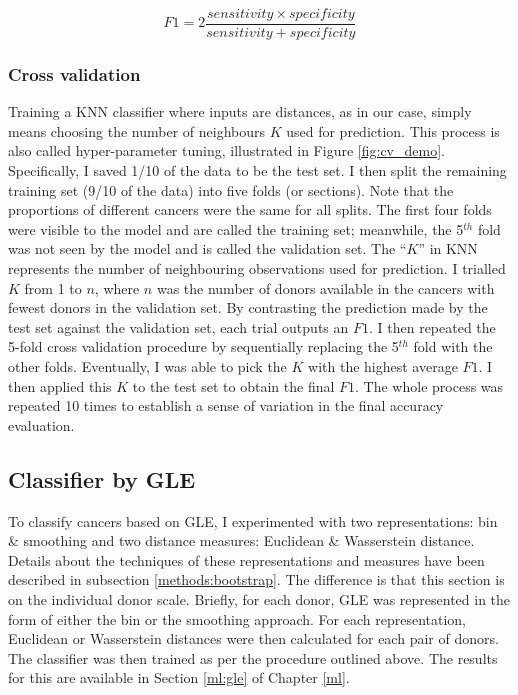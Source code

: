 \begin{equation}
    F1 = 2\frac{sensitivity \times specificity}{sensitivity + specificity}    
    \label{eq:f1}
\end{equation}

\subsubsection{Cross validation}
Training a KNN classifier where inputs are distances, as in our case, simply means choosing the number of neighbours $K$ used for prediction. This process is also called hyper-parameter tuning, illustrated in Figure \ref{fig:cv_demo}. Specifically, I saved 1/10 of the data to be the test set. I then split the remaining training set (9/10 of the data) into five folds (or sections). Note that the proportions of different cancers were the same for all splits. The first four folds were visible to the model and are called the training set; meanwhile, the 5$^{th}$ fold was not seen by the model and is called the validation set. The ``$K$'' in KNN represents the number of neighbouring observations used for prediction. I trialled $K$ from 1 to $n$, where $n$ was the number of donors available in the cancers with fewest donors in the validation set. By contrasting the prediction made by the test set against the validation set, each trial outputs an $F1$. I then repeated the 5-fold cross validation procedure by sequentially replacing the 5$^{th}$ fold with the other folds. Eventually, I was able to pick the $K$ with the highest average $F1$. I then applied this $K$ to the test set to obtain the final $F1$. The whole process was repeated 10 times to establish a sense of variation in the final accuracy evaluation.



\subsection{Classifier by GLE}
To classify cancers based on GLE, I experimented with two representations: bin \& smoothing and two distance measures: Euclidean \& Wasserstein distance. Details about the techniques of these representations and measures have been described in subsection \ref{methods:bootstrap}. The difference is that this section is on the individual donor scale. Briefly, for each donor, GLE was represented in the form of either the bin or the smoothing approach. For each representation, Euclidean or Wasserstein distances were then calculated for each pair of donors. The classifier was then trained as per the procedure outlined above. The results for this are available in Section \ref{ml:gle} of Chapter \ref{ml}.

